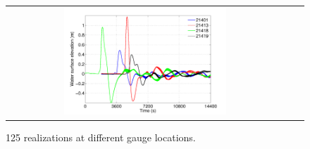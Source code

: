 \begin{figure}[h]
\centering
\begin{tabular}{clc}        
\includegraphics[width=0.6\textwidth]{./figures/rlzs_gauges.pdf} 
\end{tabular}
\caption{125 \geoclaw realizations at different gauge locations.}
\label{fig:rlzs}
\end{figure}

